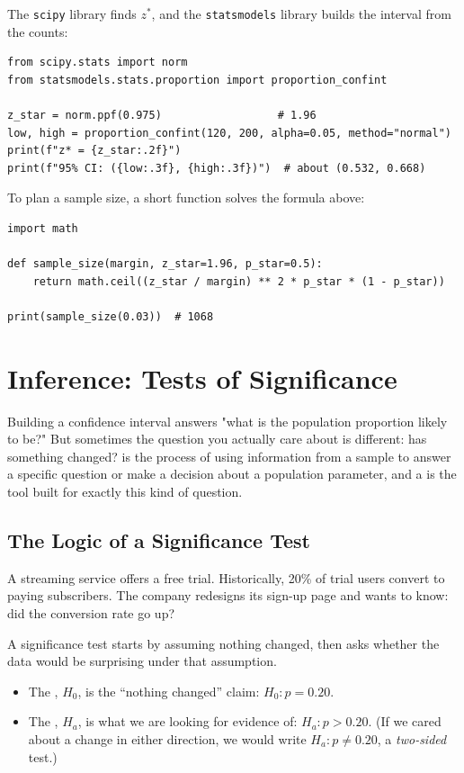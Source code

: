 The \texttt{scipy} library finds $z^*$, and the \texttt{statsmodels} library builds the interval from the counts:
\begin{verbatim}
from scipy.stats import norm
from statsmodels.stats.proportion import proportion_confint

z_star = norm.ppf(0.975)                  # 1.96
low, high = proportion_confint(120, 200, alpha=0.05, method="normal")
print(f"z* = {z_star:.2f}")
print(f"95% CI: ({low:.3f}, {high:.3f})")  # about (0.532, 0.668)
\end{verbatim}

To plan a sample size, a short function solves the formula above:
\begin{verbatim}
import math

def sample_size(margin, z_star=1.96, p_star=0.5):
    return math.ceil((z_star / margin) ** 2 * p_star * (1 - p_star))

print(sample_size(0.03))  # 1068
\end{verbatim}


\section{Inference: Tests of Significance}

Building a confidence interval answers "what is the population proportion
likely to be?" But sometimes the question you actually care about is
different: has something changed? 
is the process of using information from a sample to answer a specific
question or make a decision about a population parameter, and a
 is the tool built
for exactly this kind of question.

\subsection{The Logic of a Significance Test}

A streaming service offers a free trial. Historically, 20\% of trial users
convert to paying subscribers. The company redesigns its sign-up page and
wants to know: did the conversion rate go up?

A significance test starts by assuming nothing changed, then asks whether
the data would be surprising under that assumption.
\begin{itemize}
\item The , $H_0$, is the
``nothing changed'' claim: $H_0: p = 0.20$.
\item The ,
$H_a$, is what we are looking for evidence of: $H_a: p > 0.20$. (If we
cared about a change in either direction, we would write $H_a: p \neq
0.20$, a \emph{two-sided} test.)
\end{itemize}

